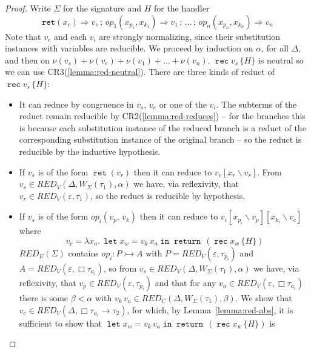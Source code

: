 \documentclass[acmsmall, screen, review, anonymous]{acmart}
\theoremstyle{definition}
\newcommand{\glob}{\mathop{\Box}}
\newcommand{\arr}{\rightarrow}
\newcommand{\ind}[1]{W_{#1}}
\newcommand{\indintro}[3]{{#1}(#2,\, #3)}
\newcommand{\retname}{\mathtt{ret}}
\newcommand{\ret}[1]{\mathop{\retname}(#1)}
\newcommand{\indelimname}{\mathtt{rec}}
\newcommand{\indelim}[2]{\mathop{\indelimname} #1 \,\{#2\}}
\newcommand{\indretcase}[2]{\retname(#1) \Rightarrow #2}
\newcommand{\indcase}[4]{#1(#2, #3) \Rightarrow #4}
\newcommand{\seq}{\,;\,}
\newcommand{\types}{\mathrel{:}}
\newcommand{\abs}[2]{\lambda#1.\,#2}
\newcommand{\app}[2]{#1\,#2}
\newcommand{\cempty}{\varepsilon}
\newcommand{\returnname}{\mathop{\mathtt{return}}}
\newcommand{\return}[1]{\returnname\, #1}
\newcommand{\letvname}{\mathop{\mathtt{let}}}
\newcommand{\letv}[3]{\letvname #1 = #2 \mathop{\mathtt{in}} #3}
\newcommand{\sub}[2]{[#1\backslash#2]}
\newcommand{\sbst}[3]{#1\sub{#2}{#3}}
\newcommand{\bound}[1]{\nu(#1)}
\newcommand{\redname}{RED}
\newcommand{\redvname}{\redname_{V}}
\newcommand{\redv}[2]{\redvname{({#1},{#2})}}
\newcommand{\redva}[3]{\redvname{({#1},{#2},{#3})}}
\newcommand{\redcname}{\redname_{C}}
\newcommand{\redca}[3]{\redcname{({#1},{#2},{#3})}}
\newcommand{\redsigname}{\redname_{E}}
\newcommand{\redsig}[1]{\redsigname{(#1)}}
\begin{document}
\begin{proof}
  Write $\Sigma$ for the signature and $H$ for the handler
  \begin{equation*}
    \indretcase{x_r}{v_e} \seq
    \indcase{op_1}{x_{p_1}}{x_{k_1}}{v_1} \seq \ldots \seq
    \indcase{op_n}{x_{p_n}}{x_{k_n}}{v_n}
  \end{equation*}
  Note that $v_e$ and each $v_i$ are strongly normalizing, since their
  substitution instances with variables are reducible. We proceed by
  induction on $\alpha$, for all $\Delta$, and then on
  $\bound{v_s} + \bound{v_e} + \bound{v_1} + \ldots +
  \bound{v_n}$. $\indelim{v_s}{H}$ is neutral so we can use
  CR3(\ref{lemma:red-neutral}). There are three kinds of reduct of
  $\indelim{v_s}{H}$:
  \begin{itemize}
  \item It can reduce by congruence in $v_s$, $v_e$ or one of the
    $v_i$. The subterms of the reduct remain reducible by
    CR2(\ref{lemma:red-reduces}) -- for the branches this is because
    each substitution instance of the reduced branch is a reduct of the
    corresponding substitution instance of the original branch -- so the
    reduct is reducible by the inductive hypothesis.
  \item If $v_s$ is of the form $\ret{v_r}$ then it can reduce to
    $\sbst{v_e}{x_r}{v_r}$. From
    $v_s \in \redva{\Delta}{\ind{\Sigma}(\tau_1)}{\alpha}$ we have,
    via reflexivity, that $v_r \in \redv{\cempty}{\tau_1}$, so
    the reduct is reducible by hypothesis.
  \item If $v_s$ is of the form $\indintro{op_i}{v_p}{v_k}$ then it can
    reduce to $\sbst{\sbst{v_i}{x_{p_i}}{v_p}}{x_{k_i}}{v_c}$ where
    \begin{equation*}
      v_c =
      \abs{x_a}{\letv{x_w}{\app{v_k}{x_a}}{\return{(\indelim{x_w}{H})}}}
    \end{equation*}
    $\redsig{\Sigma}$ contains $op_i \types P \rightarrowtail A$ with
    $P = \redv{\cempty}{\tau_{p_i}}$ and
    $A = \redv{\cempty}{\glob \tau_{a_i}}$, so from
    $v_s \in \redva{\Delta}{\ind{\Sigma}(\tau_1)}{\alpha}$ we
    have, via reflexivity, that
    $v_p \in \redv{\cempty}{\tau_{p_i}}$ and that for any
    $v_a \in \redv{\cempty}{\glob \tau_{a_i}}$ there is some
    $\beta < \alpha$ with
    $\app{v_k}{v_a} \in
    \redca{\Delta}{\ind{\Sigma}(\tau_1)}{\beta}$. We show that
    $v_c \in \redv{\Delta}{\glob \tau_{a_i} \arr \tau_2}$,
    for which, by Lemma~\ref{lemma:red-abs}, it is sufficient to show
    that $\letv{x_w}{\app{v_k}{v_a}}{\return{(\indelim{x_w}{H})}}$ is

\end{itemize}
\end{proof}
\end{document}
